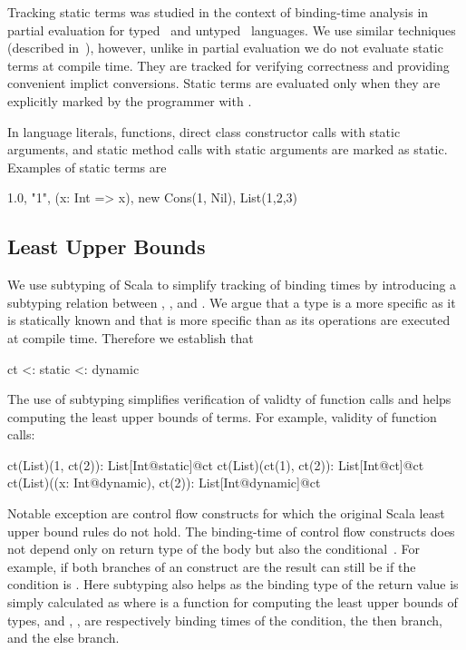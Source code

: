  Tracking static terms was studied in the context of binding-time analysis
  in partial evaluation for typed~\cite{nielson_1988_automatic} and
  untyped~\cite{gomard1991partial} languages. We use similar techniques
  (described in~), however, unlike in partial evaluation we
  do not evaluate static terms at compile time. They are tracked for verifying
  correctness and providing convenient implict conversions. Static terms are evaluated only
  when they are explicitly marked by the programmer with .

In \tool language literals, functions, direct class constructor calls with static arguments, and static method
 calls with static arguments are marked as static. Examples of static terms are\begin{lstparagraph}
1.0, "1", (x: Int => x), new Cons(1, Nil), List(1,2,3)
\end{lstparagraph}

\subsection{Least Upper Bounds}
\label{sct:lub}

 We use subtyping of Scala to simplify tracking of binding times by introducing a
 subtyping relation between , , and . We argue that
 a  type is a more specific  as it is statically known
 and that  is more specific than  as its operations are executed
 at compile time. Therefore we establish that\begin{lstparagraph}
                 ct <: static <: dynamic
\end{lstparagraph}

 The use of subtyping simplifies verification of validty of function calls and helps computing the
 least upper bounds of terms. For example, validity of function calls:\begin{lstparagraph}
ct(List)(1, ct(2)): List[Int@static]@ct
ct(List)(ct(1), ct(2)): List[Int@ct]@ct
ct(List)((x: Int@dynamic), ct(2)): List[Int@dynamic]@ct
\end{lstparagraph}

 Notable exception are control flow constructs for which the original Scala least
 upper bound rules do not hold. The binding-time of control flow constructs does not
 depend only on return type of the body but also the conditional~\cite{}. For example, if
 both branches of an  construct are  the result can still be 
 if the condition is . Here subtyping also helps as the binding type of the
 return value is simply calculated as  where  is a function
 for computing the least upper bounds of types, and , ,  are respectively
 binding times of the condition, the then branch, and the else branch.

